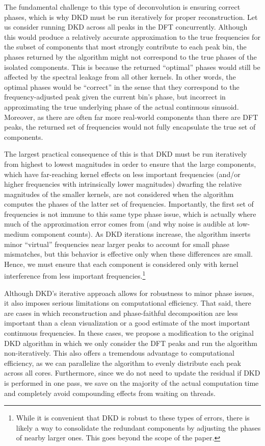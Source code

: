 \documentclass[11pt,twoside]{report}
\numberwithin{thm}{section}
\numberwithin{equation}{section}
\begin{document}
The fundamental challenge to this type of deconvolution is ensuring correct phases, which is why DKD must be run iteratively for proper reconstruction. Let us consider running DKD across all peaks in the DFT concurrently. Although this would produce a relatively accurate approximation to the true frequencies for the subset of components that most strongly contribute to each peak bin, the phases returned by the algorithm might not correspond to the true phases of the isolated components. This is because the returned ``optimal'' phases would still be affected by the spectral leakage from all other kernels. In other words, the optimal phases would be ``correct'' in the sense that they correspond to the frequency-adjusted peak given the current bin's phase, but incorrect in approximating the true underlying phase of the actual continuous sinusoid. Moreover, as there are often far more real-world components than there are DFT peaks, the returned set of frequencies would not fully encapsulate the true set of components.

The largest practical consequence of this is that DKD must be run iteratively from highest to lowest magnitudes in order to ensure that the large components, which have far-reaching kernel effects on less important frequencies (and/or higher frequencies with intrinsically lower magnitudes) dwarfing the relative magnitudes of the smaller kernels, are not considered when the algorithm computes the phases of the latter set of frequencies. Importantly, the first set of frequencies is not immune to this same type phase issue, which is actually where much of the approximation error comes from (and why noise is audible at low-medium component counts). As DKD iterations increase, the algorithm inserts minor ``virtual'' frequencies near larger peaks to account for small phase mismatches, but this behavior is effective only when these differences are small. Hence, we must ensure that each component is considered only with kernel interference from less important frequencies.\footnote{While it is convenient that DKD is robust to these types of errors, there is likely a way to consolidate the redundant components by adjusting the phases of nearby larger ones. This goes beyond the scope of the paper.}

Although DKD's iterative approach allows for robustness to minor phase issues, it also imposes serious limitations on computational efficiency. That said, there are cases in which reconstruction and phase-faithful decomposition are less important than a clean visualization or a good estimate of the most important continuous frequencies. In these cases, we propose a modification to the original DKD algorithm in which we only consider the DFT peaks and run the algorithm non-iteratively. This also offers a tremendous advantage to computational efficiency, as we can parallelize the algorithm to evenly distribute each peak across all cores. Furthermore, since we do not need to update the residual if DKD is performed in one pass, we save on the majority of the actual computation time and completely avoid compounding effects from waiting on threads.
\end{document}
